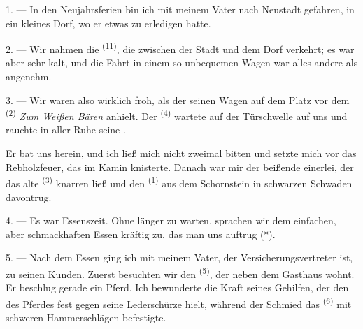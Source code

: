 
\VUsaut{4.0mm}
\VUsaut{3.0mm}
\VUfilet{16mm}
\VUsaut{5.6mm}
\VUsaut{3.0mm}

\VUsaut{3.0mm}

\VUsaut{4.0mm}

1. --- In den Neujahrsferien bin ich mit meinem Vater nach Neustadt gefahren, in
ein kleines Dorf, wo er etwas zu erledigen hatte.

2. --- Wir nahmen die  \textsuperscript{(11)}, die zwischen der
Stadt und dem Dorf verkehrt; es war aber sehr kalt, und die Fahrt in einem so
unbequemen Wagen war alles andere als angenehm.

3. --- Wir waren also wirklich froh, als der  seinen Wagen auf dem
Platz vor dem  \textsuperscript{(2)} \textit{Zum Weißen Bären}
anhielt. Der  \textsuperscript{(4)} wartete auf der Türschwelle auf uns
und rauchte in aller Ruhe seine .

Er bat uns herein, und ich ließ mich nicht zweimal bitten und setzte mich vor das
Rebholzfeuer, das im Kamin knisterte. Danach war mir der beißende
 einerlei, der das alte  \textsuperscript{(3)} knarren
ließ und den  \textsuperscript{(1)} aus dem Schornstein in schwarzen
Schwaden davontrug.

4. --- Es war Essenszeit. Ohne länger zu warten, sprachen wir dem einfachen, aber
schmackhaften Essen kräftig zu, das man uns auftrug (*).

\VUsaut{3.0mm}

5. --- Nach dem Essen ging ich mit meinem Vater, der Versicherungsvertreter ist, zu
seinen Kunden. Zuerst besuchten wir den  \textsuperscript{(5)}, der
neben dem Gasthaus wohnt. Er beschlug gerade ein Pferd. Ich bewunderte die Kraft
seines Gehilfen, der den  des Pferdes fest gegen seine Lederschürze
hielt, während der Schmied das  \textsuperscript{(6)} mit schweren
Hammerschlägen befestigte.

